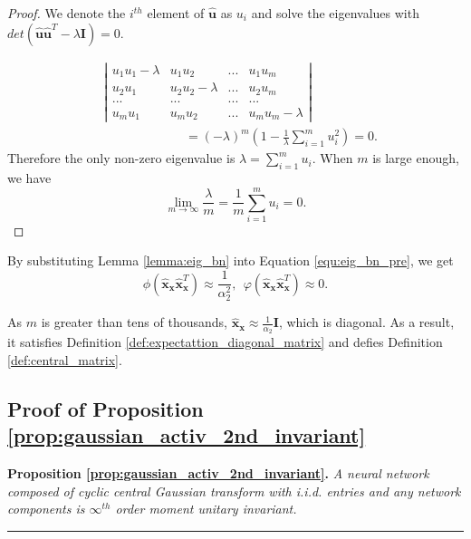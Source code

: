 \documentclass[10pt,journal,compsoc]{IEEEtran}
\begin{document}
\begin{proof}
We denote the $i^{th}$ element of $\hat{\mathbf{u}}$ as $u_i$ and solve the eigenvalues with $det(\hat{\mathbf{u}}\hat{\mathbf{u}}^T-\lambda \mathbf{I})=0$.

\begin{equation}
\begin{split}
&{\left|\begin{array}{cccc} 
    u_1u_1-\lambda &    u_1u_2    & ... &u_1u_m \\ 
    u_2u_1 &    u_2u_2 - \lambda    & ... &u_2u_m \\
    ... & ... & ...&...\\
    u_mu_1 &    u_mu_2    & ... &u_mu_m-\lambda
\end{array}\right|}\\
&~~~~~~~~~~~~~~~~~~~~~~~~~~~~~=\left(-\lambda\right)^m\left(1-\frac{1}{\lambda}\sum_{i=1}^mu_i^2\right)=0.
\end{split}
\label{equ:uut}
\end{equation}
Therefore the only non-zero eigenvalue is $\lambda = \sum_{i=1}^mu_i$.
When $m$ is large enough, we have
\begin{equation}
    \lim_{m\rightarrow \infty}\frac{\lambda}{m} = \frac{1}{m}\sum_{i=1}^mu_i = 0.
\end{equation}
\end{proof}

By substituting Lemma \ref{lemma:eig_bn} into Equation \eqref{equ:eig_bn_pre}, we get
\begin{equation}
    \phi(\hat{\mathbf{x}}_{\mathbf{x}}\hat{\mathbf{x}}_{\mathbf{x}}^T) \approx \frac{1}{\alpha_2^2},~~\varphi(\hat{\mathbf{x}}_{\mathbf{x}}\hat{\mathbf{x}}_{\mathbf{x}}^T) \approx 0.
\label{equ:eig_l2n}
\end{equation}

As $m$ is greater than tens of thousands, $\hat{\mathbf{x}}_{\mathbf{x}}\approx\frac{1}{\alpha_2}\mathbf{I}$, which is diagonal. As a result, it satisfies Definition \ref{def:expectattion_diagonal_matrix} and defies Definition \ref{def:central_matrix}.
 
\subsection{Proof of Proposition \ref{prop:gaussian_activ_2nd_invariant}}\label{proof:gaussian_activ_2nd_invariant}

\textbf{Proposition \ref{prop:gaussian_activ_2nd_invariant}. } \textit{A neural network composed of cyclic central Gaussian transform with i.i.d. entries and any network components is $\infty^{th}$ order moment unitary invariant.}
\rule[0pt]{0.48\textwidth}{0.05em}
\end{document}
